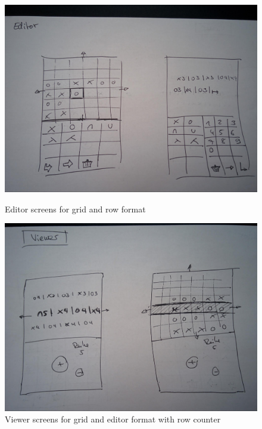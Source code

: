 \begin{figure}
\centering
\begin{minipage}{0.7\textwidth}
  \centering
  \includegraphics[width=1\linewidth]{images/image00.jpg}
  \caption[Editor screens for grid and row format \small (own image)]{Editor screens for grid and row format}
  \label{fig_wireframe3}
\end{minipage}

\begin{minipage}{0.7\textwidth}
  \centering
  \includegraphics[width=1\linewidth]{images/image02.jpg}
  \caption[Viewer screens for grid and editor format with row counter \small (own image)]{Viewer screens for grid and editor format with row counter}
  \label{fig_wireframe4}
\end{minipage}
\end{figure}